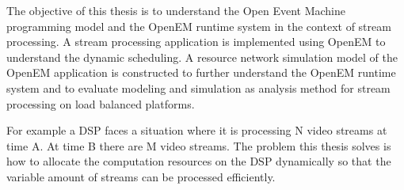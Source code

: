 The objective of this thesis is to understand the Open Event Machine programming model and the OpenEM runtime system in the context of stream processing. A stream processing application is implemented using OpenEM to understand the dynamic scheduling. A resource network simulation model of the OpenEM application is constructed to further understand the OpenEM runtime system and to evaluate modeling and simulation as analysis method for stream processing on load balanced platforms. 

For example a DSP faces a situation where it is processing N video streams at time A. At time B there are M video streams. The problem this thesis solves is how to allocate the computation resources on the DSP dynamically so that the variable amount of streams can be processed efficiently.